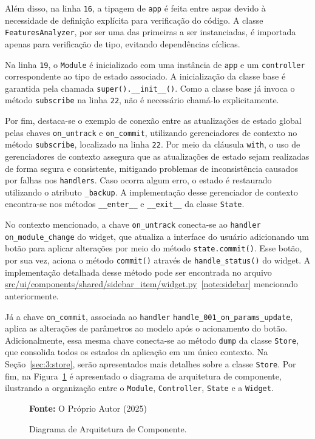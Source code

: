 Além disso, na linha \texttt{16}, a tipagem de \texttt{app} é feita entre aspas devido à necessidade de definição explícita para verificação do código. A classe \texttt{FeaturesAnalyzer}, por ser uma das primeiras a ser instanciadas, é importada apenas para verificação de tipo, evitando dependências cíclicas.

Na linha \texttt{19}, o \texttt{Module} é inicializado com uma instância de \texttt{app} e um \texttt{controller} correspondente ao tipo de estado associado. A inicialização da classe base é garantida pela chamada \texttt{super().\_\_init\_\_()}. Como a classe base já invoca o método \texttt{subscribe} na linha \texttt{22}, não é necessário chamá-lo explicitamente.

Por fim, destaca-se o exemplo de conexão entre as atualizações de estado global pelas chaves \texttt{on\_untrack} e \texttt{on\_commit}, utilizando gerenciadores de contexto no método \texttt{subscribe}, localizado na linha \texttt{22}. Por meio da cláusula \texttt{with}, o uso de gerenciadores de contexto assegura que as atualizações de estado sejam realizadas de forma segura e consistente, mitigando problemas de inconsistência causados por falhas nos \texttt{handlers}. Caso ocorra algum erro, o estado é restaurado utilizando o atributo \texttt{\_backup}. A implementação desse gerenciador de contexto encontra-se nos métodos \texttt{\_\_enter\_\_} e \texttt{\_\_exit\_\_} da classe \texttt{State}.

No contexto mencionado, a chave \texttt{on\_untrack} conecta-se ao \texttt{handler} \texttt{on\_module\_change} do widget, que atualiza a interface do usuário adicionando um botão para aplicar alterações por meio do método \texttt{state.commit()}. Esse botão, por sua vez, aciona o método \texttt{commit()} através de \texttt{handle\_status()} do widget. A implementação detalhada desse método pode ser encontrada no arquivo \href{https://github.com/ZauJulio/FeaturesAnalyzer/blob/test/src/ui/components/shared/sidebar_item/widget.py}{\underline{src/ui/components/shared/sidebar\_item/widget.py}}~\ref{note:sidebar} mencionado anteriormente.

Já a chave \texttt{on\_commit}, associada ao \texttt{handler} \texttt{handle\_001\_on\_params\_update}, aplica as alterações de parâmetros ao modelo após o acionamento do botão. Adicionalmente, essa mesma chave conecta-se ao método \texttt{dump} da classe \texttt{Store}, que consolida todos os estados da aplicação em um único contexto. Na Seção~\ref{sec:3:store}, serão apresentados mais detalhes sobre a classe \texttt{Store}. Por fim, na Figura~\ref{fig:3:cd-arch-base} é apresentado o diagrama de arquitetura de componente, ilustrando a organização entre o \texttt{Module}, \texttt{Controller}, \texttt{State} e a \texttt{Widget}.

\begin{figure}[h!]
    \centerline{}
    \caption{Diagrama de Arquitetura de Componente.}
    \centerline{\textbf{Fonte:} O Próprio Autor (2025)}
    \label{fig:3:cd-arch-base}
\end{figure}
